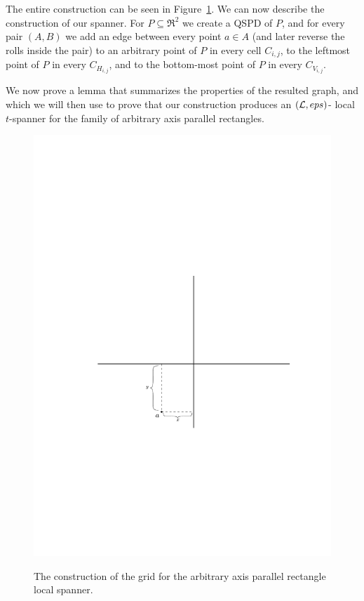 \documentclass[12pt]{article}%
\begin{document}
The entire construction can be seen in Figure~\ref{fig:grid_construction}. We can now describe the construction of our spanner. For $P\subseteq \Re^2$ we create a QSPD of $P$, and for every pair $(A,B)$ we add an edge between every point $a\in A$ (and later reverse the rolls inside the pair) to an arbitrary point of $P$ in every cell $C_{i,j}$, to the leftmost point of $P$ in every $C_{H_{i,j}}$, and to the bottom-most point of $P$ in every $C_{V_{i,j}}$.

We now prove a lemma that summarizes the properties of the resulted graph, and which we will then use to prove that our construction produces an $(\mathcal{L}, eps)$- local $t$-spanner for the family of arbitrary axis parallel rectangles. 

\begin{figure}
	\centering
	\includegraphics[width=\linewidth, page=3]{figs/grid_construction.pdf}
	\label{fig:grid_construction}
	\caption{The construction of the grid for the arbitrary axis parallel rectangle local spanner.}
\end{figure}
\end{document}
